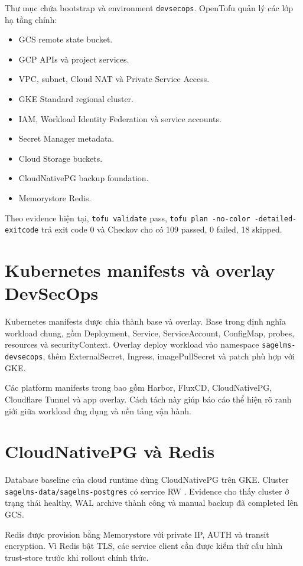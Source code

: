 Thư mục  chứa bootstrap và environment \texttt{devsecops}. OpenTofu quản lý các lớp hạ tầng chính:

\begin{itemize}
  \item GCS remote state bucket.
  \item GCP APIs và project services.
  \item VPC, subnet, Cloud NAT và Private Service Access.
  \item GKE Standard regional cluster.
  \item IAM, Workload Identity Federation và service accounts.
  \item Secret Manager metadata.
  \item Cloud Storage buckets.
  \item CloudNativePG backup foundation.
  \item Memorystore Redis.
\end{itemize}

Theo evidence hiện tại, \texttt{tofu validate} pass, \texttt{tofu plan -no-color -detailed-exitcode} trả exit code 0 và Checkov cho  có 109 passed, 0 failed, 18 skipped.

\section{Kubernetes manifests và overlay DevSecOps}

Kubernetes manifests được chia thành base và overlay. Base trong  định nghĩa workload chung, gồm Deployment, Service, ServiceAccount, ConfigMap, probes, resources và securityContext. Overlay  deploy workload vào namespace \texttt{sagelms-devsecops}, thêm ExternalSecret, Ingress, imagePullSecret và patch phù hợp với GKE.

Các platform manifests trong  bao gồm Harbor, FluxCD, CloudNativePG, Cloudflare Tunnel và app overlay. Cách tách này giúp báo cáo thể hiện rõ ranh giới giữa workload ứng dụng và nền tảng vận hành.

\section{CloudNativePG và Redis}

Database baseline của cloud runtime dùng CloudNativePG trên GKE. Cluster \texttt{sagelms-data/sagelms-postgres} có service RW . Evidence cho thấy cluster ở trạng thái healthy, WAL archive thành công và manual backup đã completed lên GCS.

Redis được provision bằng Memorystore với private IP, AUTH và transit encryption. Vì Redis bật TLS, các service client cần được kiểm thử cấu hình trust-store trước khi rollout chính thức.
